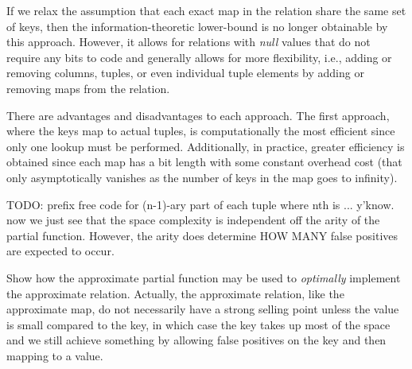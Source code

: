 \documentclass[ ../main.tex]{subfiles}
\begin{document}
If we relax the assumption that each exact map in the relation share the same set of keys, then the information-theoretic lower-bound is no longer obtainable by this approach. However, it allows for relations with \emph{null} values that do not require any bits to code and generally allows for more flexibility, i.e., adding or removing columns, tuples, or even individual tuple elements by adding or removing maps from the relation.

There are advantages and disadvantages to each approach. The first approach, where the keys map to actual tuples, is computationally the most efficient since only one lookup must be performed. Additionally, in practice, greater efficiency is obtained since each map has a bit length with some constant overhead cost (that only asymptotically vanishes as the number of keys in the map goes to infinity).







TODO: prefix free code for (n-1)-ary part of each tuple where nth is ... y'know. now we just see that the space complexity is independent off the arity of the partial function. However, the arity does determine HOW MANY false positives are expected to occur.

Show how the approximate partial function may be used to \emph{optimally} implement the approximate relation. Actually, the approximate relation, like the approximate map, do not necessarily have a strong selling point unless the value is small compared to the key, in which case the key takes up most of the space and we still achieve something by allowing false positives on the key and then mapping to a value.
\end{document}
